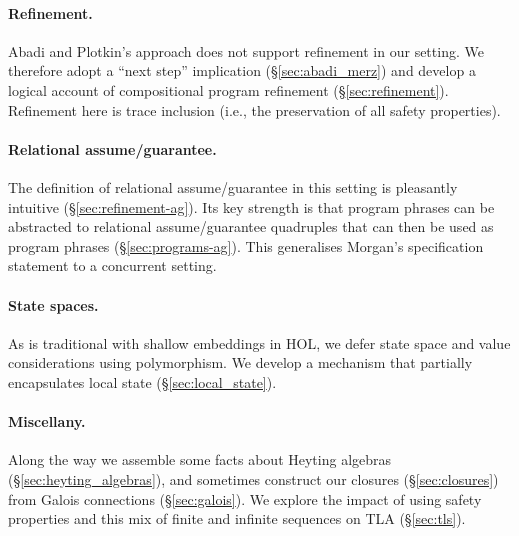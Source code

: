 \documentclass[11pt,a4paper]{article}
\begin{document}
\paragraph{Refinement.} Abadi and Plotkin's approach does not support
refinement in our setting. We therefore adopt a ``next step''
implication (\S\ref{sec:abadi_merz}) and develop a logical account of
compositional program refinement (\S\ref{sec:refinement}). Refinement
here is trace inclusion (i.e., the preservation of all safety
properties).

\paragraph{Relational assume/guarantee.} The definition of relational
assume/guarantee in this setting is pleasantly intuitive
(\S\ref{sec:refinement-ag}). Its key strength is that program phrases
can be abstracted to relational assume/guarantee quadruples that can
then be used as program phrases (\S\ref{sec:programs-ag}). This
generalises Morgan's specification statement to a concurrent setting.

\paragraph{State spaces.} As is traditional with shallow embeddings in
HOL, we defer state space and value considerations using
polymorphism. We develop a mechanism that partially encapsulates local
state (\S\ref{sec:local_state}).

\paragraph{Miscellany.} Along the way we assemble some facts about
Heyting algebras (\S\ref{sec:heyting_algebras}), and sometimes
construct our closures (\S\ref{sec:closures}) from Galois connections
(\S\ref{sec:galois}). We explore the impact of using safety properties
and this mix of finite and infinite sequences on TLA
(\S\ref{sec:tls}).




\end{document}
